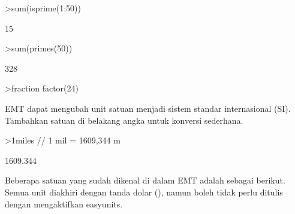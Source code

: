\documentclass{article}
\begin{document}
\begin{eulernotebook}
\begin{eulercomment}
\begin{eulercomment}
\begin{eulerprompt}
\end{eulerprompt}
\begin{euleroutput}
  [2,  3,  5,  7,  11,  13,  17,  19,  23,  29,  31,  37,  41,  43,  47]
\end{euleroutput}
\begin{eulerprompt}
>sum(isprime(1:50))
\end{eulerprompt}
\begin{euleroutput}
  15
\end{euleroutput}
\begin{eulerprompt}
>sum(primes(50))
\end{eulerprompt}
\begin{euleroutput}
  328
\end{euleroutput}
\begin{eulerprompt}
>fraction factor(24)
\end{eulerprompt}
\begin{euleroutput}
  [2,  2,  2,  3]
\end{euleroutput}
\begin{eulercomment}
\begin{eulercomment}
\begin{eulercomment}
EMT dapat mengubah unit satuan menjadi sistem standar internasional
(SI). Tambahkan satuan di belakang angka untuk konversi sederhana.
\end{eulercomment}
\begin{eulerprompt}
>1miles  // 1 mil = 1609,344 m
\end{eulerprompt}
\begin{euleroutput}
  1609.344
\end{euleroutput}
\begin{eulercomment}
Beberapa satuan yang sudah dikenal di dalam EMT adalah sebagai
berikut. Semua unit diakhiri dengan tanda dolar (\textdollar{}), namun boleh tidak
perlu ditulis dengan mengaktifkan easyunits. 


\end{eulercomment}
\end{eulercomment}
\end{eulercomment}
\end{eulercomment}
\end{eulercomment}
\end{eulernotebook}
\end{document}
